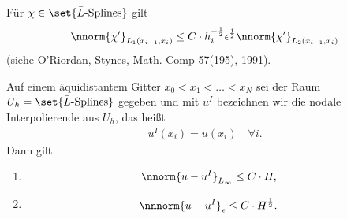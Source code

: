 \begin{bemerkung*}
  Für $\chi \in \set{\bar L\text{-Splines}}$ gilt
  \begin{align*}
    \nnorm{\chi'}_{L_{1}(x_{i-1}, x_{i})} \leq C\cdot h_{i}^{- \frac 12} \epsilon^{\frac 12}\nnorm{\chi'}_{L_{2}(x_{i-1}, x_{i})}
  \end{align*}
(siehe O'Riordan, Stynes, Math. Comp 57(195), 1991). 
\end{bemerkung*}
\begin{lemma}\label{lem:6-4}
  Auf einem äquidistantem Gitter $x_{0}< x_{1}< \dots < x_{N}$ sei der Raum $U_{h} = \set{\bar L\text{-Splines}}$ gegeben und mit $u^{I}$ bezeichnen wir die nodale Interpolierende aus $U_{h}$, das heißt
  \begin{align*}
    u^{I}(x_{i}) = u(x_{i}) \quad \forall i. 
  \end{align*}
Dann gilt
\begin{enumerate}
\item \begin{align*}
  \nnorm{u-u^{I}}_{L_{\infty}} &\leq C\cdot H, 
\end{align*}
\item
  \begin{align*}
      \nnnorm{u-u^{I}}_{\epsilon} &\leq  C\cdot H^{\frac 12}. 
  \end{align*}
\end{enumerate}
\end{lemma}
